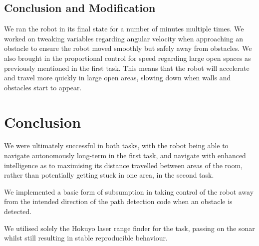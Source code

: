 \documentclass[twocolumn,11pt]{article}
\begin{document}
\subsection{Conclusion and Modification}

We ran the robot in its final state for a number of minutes multiple times. We worked on tweaking variables regarding angular velocity when approaching an obstacle to ensure the robot moved smoothly but safely away from obstacles. We also brought in the proportional control for speed regarding large open spaces as previously mentioned in the first task. This means that the robot will accelerate and travel more quickly in large open areas, slowing down when walls and obstacles start to appear.

\section{Conclusion}

We were ultimately successful in both tasks, with the robot being able to navigate autonomously long-term in the first task, and navigate with enhanced intelligence as to maximising its distance travelled between areas of the room, rather than potentially getting stuck in one area, in the second task. 

We implemented a basic form of subsumption in taking control of the robot away from the intended direction of the path detection code when an obstacle is detected. 

We utilised solely the \textsf{Hokuyo} laser range finder for the task, passing on the sonar whilst still resulting in stable reproducible behaviour.



\end{document}
